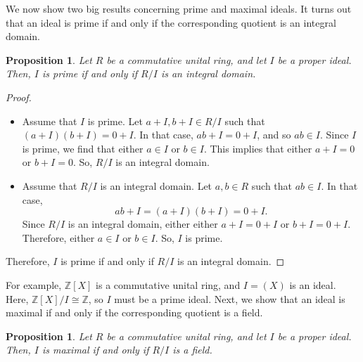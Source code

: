 \documentclass[a4paper, openany]{memoir}
\theoremstyle{definition}
\theoremstyle{plain}
\newtheorem{proposition}[definition]{Proposition}
\begin{document}
We now show two big results concerning prime and maximal ideals. It turns out that an ideal is prime if and only if the corresponding quotient is an integral domain.
\begin{proposition}
Let $R$ be a commutative unital ring, and let $I$ be a proper ideal. Then, $I$ is prime if and only if $R/I$ is an integral domain.
\end{proposition}
\begin{proof}
\hspace*{0pt}
\begin{itemize}
    \item Assume that $I$ is prime. Let $a + I, b + I \in R/I$ such that $(a + I)(b + I) = 0 + I$. In that case, $ab + I = 0 + I$, and so $ab \in I$. Since $I$ is prime, we find that either $a \in I$ or $b \in I$. This implies that either $a + I = 0$ or $b + I = 0$. So, $R/I$ is an integral domain.
    
    \item Assume that $R/I$ is an integral domain. Let $a, b \in R$ such that $ab \in I$. In that case, 
    \[ab + I = (a + I)(b + I) = 0 + I.\]
    Since $R/I$ is an integral domain, either either $a + I = 0 + I$ or $b + I = 0 + I$. Therefore, either $a \in I$ or $b \in I$. So, $I$ is prime.
\end{itemize}
Therefore, $I$ is prime if and only if $R/I$ is an integral domain.
\end{proof}
\noindent For example, $\mathbb{Z}[X]$ is a commutative unital ring, and $I = (X)$ is an ideal. Here, $\mathbb{Z}[X]/I \cong \mathbb{Z}$, so $I$ must be a prime ideal. Next, we show that an ideal is maximal if and only if the corresponding quotient is a field.
\begin{proposition}
Let $R$ be a commutative unital ring, and let $I$ be a proper ideal. Then, $I$ is maximal if and only if $R/I$ is a field.
\end{proposition}
\end{document}

